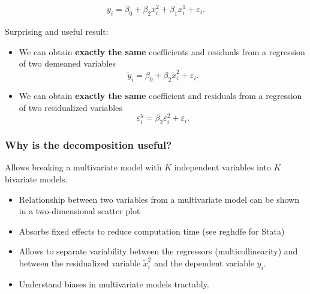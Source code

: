 \documentclass[a4paper,12pt]{article}
\begin{document}
\begin{eqnarray}
y_i =\beta_0+\beta_{2}x^{2}_i+\beta_{1}x^{\text{1}}_i+\varepsilon_i.\nonumber
\end{eqnarray}

Surprising and useful result:
\begin{itemize}
	\item We can obtain \textbf{exactly the same} coefficients and residuals from a regression of two \textcolor{red1}{demeaned} variables
$$\tilde{y}_i=\beta_0+\beta_2\tilde{x}^{2}_i+\varepsilon_i.$$
	\item We can obtain \textbf{exactly the same} coefficient and residuals from a regression of two \textcolor{red1}{residualized} variables
	$$\varepsilon^{y}_i=\beta_{2}\varepsilon^{2}_i+\varepsilon_i.$$
\end{itemize}



\subsubsection*{Why is the decomposition useful?}
Allows breaking a multivariate model with $K$ independent variables into $K$ bivariate models.

\begin{itemize}
	\item Relationship between two variables from a multivariate model can be shown in a two-dimensional scatter plot
	\item Absorbs fixed effects to reduce computation time (see reghdfe for Stata)
	\item Allows to separate variability between the regressors (multicollinearity) and between the residualized variable $\tilde{x}^{2}_i$ and the dependent variable $y_i$.
	\item Understand biases in multivariate models tractably.
\end{itemize}
\end{document}

